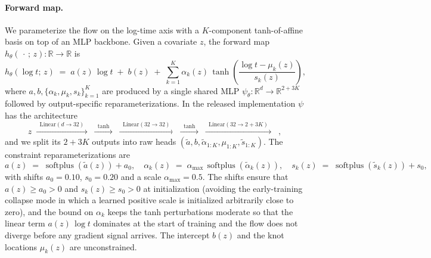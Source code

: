 \paragraph{Forward map.}
We parameterize the flow on the log-time axis with a $K$-component
tanh-of-affine basis on top of an MLP backbone. Given a covariate $z$, the
forward map $h_\theta(\,\cdot\,;\, z): \mathbb{R} \to \mathbb{R}$ is
\begin{equation}
    h_\theta(\log t;\, z)
    \;=\;
    a(z)\,\log t \;+\; b(z)
        \;+\; \sum_{k=1}^{K} \alpha_k(z)\, \tanh\!\left(\frac{\log t - \mu_k(z)}{s_k(z)}\right),
    \label{eq:flow}
\end{equation}
where $a, b, \{\alpha_k, \mu_k, s_k\}_{k=1}^{K}$ are produced by a single
shared MLP $\psi_\theta: \mathbb{R}^{d} \to \mathbb{R}^{2 + 3K}$ followed by
output-specific reparameterizations. In the released implementation $\psi$
has the architecture
\[
    z
    \;\xrightarrow{\;\;\text{Linear}(d \to 32)\;\;}
    \;\xrightarrow{\;\;\tanh\;\;}
    \;\xrightarrow{\;\;\text{Linear}(32 \to 32)\;\;}
    \;\xrightarrow{\;\;\tanh\;\;}
    \;\xrightarrow{\;\;\text{Linear}(32 \to 2 + 3K)\;\;}
    \;\;,
\]
and we split its $2 + 3K$ outputs into raw heads
$(\widetilde{a}, b, \widetilde{\alpha}_{1:K}, \mu_{1:K}, \widetilde{s}_{1:K})$.
The constraint reparameterizations are
\begin{equation}
    a(z) \;=\; \operatorname{softplus}(\widetilde{a}(z)) + a_0,
    \quad
    \alpha_k(z) \;=\; \alpha_{\max}\,\operatorname{softplus}(\widetilde{\alpha}_k(z)),
    \quad
    s_k(z) \;=\; \operatorname{softplus}(\widetilde{s}_k(z)) + s_0,
    \label{eq:reparam}
\end{equation}
with shifts $a_0 = 0.10$, $s_0 = 0.20$ and a scale $\alpha_{\max} = 0.5$. The
shifts ensure that $a(z) \ge a_0 > 0$ and $s_k(z) \ge s_0 > 0$ at
initialization (avoiding the early-training collapse mode in which a learned
positive scale is initialized arbitrarily close to zero), and the bound on
$\alpha_k$ keeps the tanh perturbations moderate so that the linear term
$a(z)\,\log t$ dominates at the start of training and the flow does not
diverge before any gradient signal arrives. The intercept $b(z)$ and the knot
locations $\mu_k(z)$ are unconstrained.

